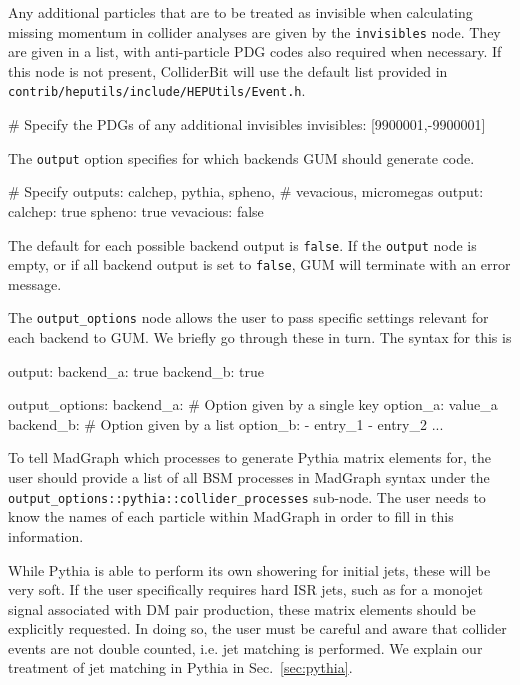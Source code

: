 \documentclass[pdftex,twocolumn,epjc3_preprint,runningheads]{svjour3}
\renewcommand{\_}{\discretionary{\underscore}{}{\underscore}}
\newcommand\term[1]{{\lstset{style=terminal}\lstinline!#1!\lstset{style=cpp}}}
\newcommand\guminline[1]{{{\lstset{style=gum}\lstinline!#1!}}}
\newcommand{\colliderbit}{\textsf{ColliderBit}\xspace}
\newcommand{\pythia}{\textsf{Pythia}\xspace}
\newcommand{\gum}{\textsf{GUM}\xspace}
\newcommand{\MG}{\textsf{MadGraph}\xspace}
\begin{document}
Any additional particles that are to be treated as invisible when calculating missing momentum in collider analyses are given by the \guminline{invisibles} node. They are given in a list, with anti-particle PDG codes also required when necessary. If this node is not present, \colliderbit will use the default list provided in \term{contrib/heputils/include/HEPUtils/Event.h}.

\begin{lstgum}
# Specify the PDGs of any additional invisibles
invisibles: [9900001,-9900001]
\end{lstgum}


The \guminline{output} option specifies for which backends \gum should generate code.
%
\begin{lstgum}
# Specify outputs: calchep, pythia, spheno,
# vevacious, micromegas
output:
  calchep: true
  spheno: true
  vevacious: false
\end{lstgum}
The default for each possible backend output is \guminline{false}. If the \guminline{output} node is empty, or if all backend output is set to \guminline{false}, \gum will terminate with an error message.

The \guminline{output_options} node allows the user to pass specific settings relevant for each backend to \gum. We briefly go through these in turn. The syntax for this is
%
\begin{lstgum}
output:
  backend_a: true
  backend_b: true

output_options:
  backend_a:
    # Option given by a single key
    option_a: value_a
  backend_b:
    # Option given by a list
    option_b:
    - entry_1
    - entry_2
    ...
\end{lstgum}

To tell \MG which processes to generate \pythia matrix elements for, the user should provide a list of all BSM processes in \MG syntax under the \guminline{output_options::pythia::collider_processes} sub-node. The user needs to know the names of each particle within \MG in order to fill in this information.

While \pythia is able to perform its own showering for initial jets, these will be very soft. If the user specifically requires hard ISR jets, such as for a monojet signal associated with DM pair production, these matrix elements should be explicitly requested.   In doing so, the user must be careful and aware that collider events are not double counted, i.e. jet matching is performed. We explain our treatment of jet matching in \pythia in Sec.~\ref{sec:pythia}.
\end{document}
